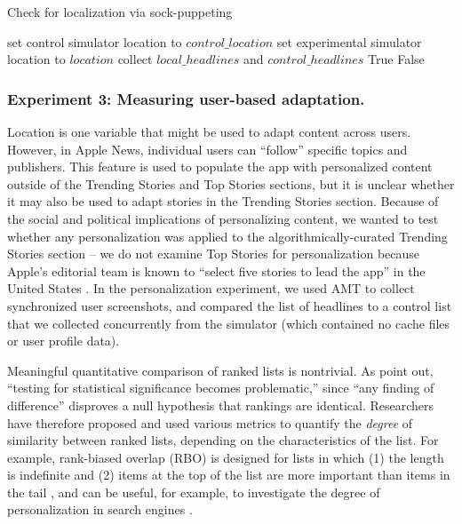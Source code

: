 \begin{algorithm}
\caption{Check for localization via sock-puppeting}\label{localization_algorithm}
\begin{algorithmic} 
\STATE set control simulator location to $control\_location$
\STATE set experimental simulator location to $location$
\STATE collect $local\_headlines$ and $control\_headlines$
\RETURN True 
\ENDIF
\ENDFOR
\RETURN False 
\end{algorithmic}
\end{algorithm}

\subsubsection{Experiment 3: Measuring user-based adaptation.}
Location is one variable that might be used to adapt content across users. However, in Apple News, individual users can ``follow'' specific topics and publishers. This feature is used to populate the app with personalized content outside of the Trending Stories and Top Stories sections, but it is unclear whether it may also be used to adapt stories in the Trending Stories section. Because of the social and political implications of personalizing content, we wanted to test whether any personalization was applied to the algorithmically-curated Trending Stories section -- we do not examine Top Stories for personalization because Apple's editorial team is known to ``select five stories to lead the app'' in the United States \citep{Nicas2018}. In the personalization experiment, we used AMT to collect synchronized user screenshots, and compared the list of headlines to a control list that we collected concurrently from the simulator (which contained no cache files or user profile data).

Meaningful quantitative comparison of ranked lists is nontrivial. As \cite{Webber2010} point out, ``testing for statistical significance becomes problematic,'' since ``any finding of difference'' disproves a null hypothesis that rankings are identical. Researchers have therefore proposed and used various metrics to quantify the \textit{degree} of similarity between ranked lists, depending on the characteristics of the list. For example, rank-biased overlap (RBO) is designed for lists in which (1) the length is indefinite and (2) items at the top of the list are more important than items in the tail \citep{Webber2010}, and can be useful, for example, to investigate the degree of personalization in search engines  \citep{Robertson2018a}. 

